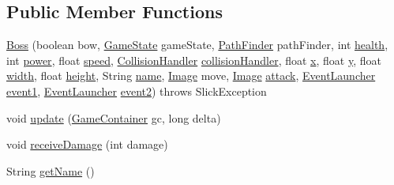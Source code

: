 \subsection*{Public Member Functions}
\begin{DoxyCompactItemize}
\item 
\mbox{\hyperlink{classentities_1_1_boss_a777259c0c3dfa9b82e3f719c978976f4}{Boss}} (boolean bow, \mbox{\hyperlink{classstates_1_1_game_state}{Game\+State}} game\+State, \mbox{\hyperlink{classentities_1_1_path_finder}{Path\+Finder}} path\+Finder, int \mbox{\hyperlink{classentities_1_1_subject_a8285660fdae3f0b220bbc686cf5c012c}{health}}, int \mbox{\hyperlink{classentities_1_1_subject_a7bd41d6fe9656de66d4a08c4a9565ec4}{power}}, float \mbox{\hyperlink{classentities_1_1_mobile_entity_a815a9d2b23a0bb7e3ee7739d4c10d7c3}{speed}}, \mbox{\hyperlink{classentities_1_1_collision_handler}{Collision\+Handler}} \mbox{\hyperlink{classentities_1_1_mobile_entity_a29fbe797671b1fc81eafe1e48fdc46f9}{collision\+Handler}}, float \mbox{\hyperlink{classorg_1_1newdawn_1_1slick_1_1geom_1_1_shape_a3e985bfff386c15a4efaad03d8ad60d3}{x}}, float \mbox{\hyperlink{classorg_1_1newdawn_1_1slick_1_1geom_1_1_shape_a9f934baded6a1b65ebb69e7e5f80ea00}{y}}, float \mbox{\hyperlink{classorg_1_1newdawn_1_1slick_1_1geom_1_1_rectangle_a967e1823f62daf45abb142779d1be62d}{width}}, float \mbox{\hyperlink{classorg_1_1newdawn_1_1slick_1_1geom_1_1_rectangle_a3bd010fdce636fc11ed0e0ad4d4b4a0a}{height}}, String \mbox{\hyperlink{classentities_1_1_boss_a859a82dc20d22942934fb9f508b87310}{name}}, \mbox{\hyperlink{classorg_1_1newdawn_1_1slick_1_1_image}{Image}} move, \mbox{\hyperlink{classorg_1_1newdawn_1_1slick_1_1_image}{Image}} \mbox{\hyperlink{classentities_1_1_subject_a1f8a6d36e95270aee0e8d46e1c6c0712}{attack}}, \mbox{\hyperlink{interfaceentities_1_1_event_launcher}{Event\+Launcher}} \mbox{\hyperlink{classentities_1_1_boss_a83ec98699f7d7252a29bbf6aa70c0201}{event1}}, \mbox{\hyperlink{interfaceentities_1_1_event_launcher}{Event\+Launcher}} \mbox{\hyperlink{classentities_1_1_boss_a17e07c1e6ee08f6f8a7250ba25828199}{event2}})  throws Slick\+Exception 
\item 
void \mbox{\hyperlink{classentities_1_1_boss_a4571ec7a8c673adccf47b7271a55f1e8}{update}} (\mbox{\hyperlink{classorg_1_1newdawn_1_1slick_1_1_game_container}{Game\+Container}} gc, long delta)
\item 
void \mbox{\hyperlink{classentities_1_1_boss_aec4d14cfccd10ccf26b0dc7548c6ff96}{receive\+Damage}} (int damage)
\item 
String \mbox{\hyperlink{classentities_1_1_boss_a73747c90d3363bbefa2589abddb164d3}{get\+Name}} ()

\end{DoxyCompactItemize}

